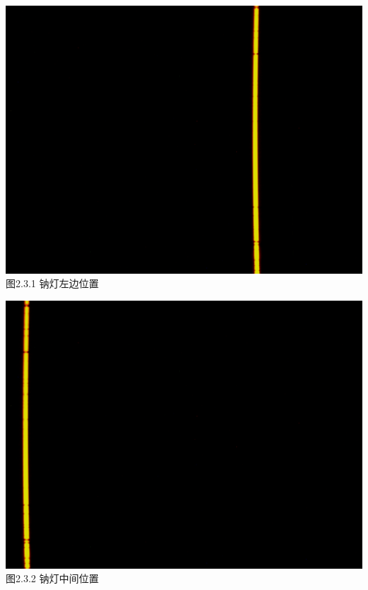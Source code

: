 \documentclass{ctexart}
\begin{document}
~\\
\begin{minipage}[c]{0.33\textwidth}
    \includegraphics[scale=0.05]{1-3} \\\small{图2.3.1 钠灯左边位置}\centering
\end{minipage}
\begin{minipage}[c]{0.33\textwidth}
    \includegraphics[scale=0.05]{2-3} \\\small{图2.3.2 钠灯中间位置}\centering
\end{minipage}
\end{document}
